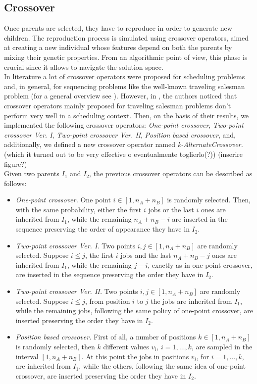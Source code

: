 \documentclass[opre,nonblindrev]{informs3} %
\begin{document}
\subsection{Crossover}
Once parents are selected, they have to reproduce in order to generate new children. The reproduction process is simulated using crossover operators, aimed at creating a new individual whose features depend on both the parents by mixing their genetic properties. From an algorithmic point of view, this phase is crucial since it allows to navigate the solution space. \\
In literature a lot of crossover operators were proposed for scheduling problems and, in general, for sequencing problems like the well-known traveling salesman problem (for a general overview see \cite{cross1}). However, in \cite{sched1}, the authors noticed that crossover operators mainly proposed for traveling salesman problems don't perform very well in a scheduling context. Then, on the basis of their results, we implemented the following crossover operators: \textit{One-point crossover}, \textit{Two-point crossover Ver. I}, \textit{Two-point crossover Ver. II}, \textit{Position based crossover}, and, additionally, we defined a new crossover operator named \textit{k-AlternateCrossover.} (which it turned out to be very effective o eventualmente toglierlo(?)) (inserire figure?)\\
Given two parents $I_1$ and $I_2$, the previous crossover operators can be described as follows: 
\begin{itemize}
	\item \textit{One-point crossover.} One point $i \in [1,n_A+n_B]$ is randomly selected. Then, with the same probability, either the first $i$ jobs or the last $i$ ones are inherited from $I_1$, while the remaining $n_A+n_B-i$ are inserted in the sequence preserving the order of appearance they have in $I_2$. 
	\item \textit{Two-point crossover Ver. I.} Two points $i,j \in [1,n_A+n_B]$ are randomly selected. Suppose $i \le j$, the first $i$ jobs and the last $n_A+n_B-j$ ones are inherited from $I_1$, while the remaining $j-i$, exactly as in one-point crossover, are inserted in the sequence preserving the order they have in $I_2$.
	\item \textit{Two-point crossover Ver. II.} Two points $i,j \in [1,n_A+n_B]$ are randomly selected. Suppose $i \le j$, from position $i$ to $j$ the jobs are inherited from $I_1$, while the remaining jobs, following the same policy of one-point crossover, are inserted preserving the order they have in $I_2$.
	\item \textit{Position based crossover.} First of all, a number of positions $k \in [1,n_A+n_B]$ is randomly selected, then $k$ different values $v_i$, $i=1,\ldots,k$, are sampled in the interval $[1,n_A+n_B].$ At this point the jobs in positions $v_i$, for $i=1,\ldots,k$, are inherited from $I_1$, while the others, following the same idea of one-point crossover, are inserted preserving the order they have in $I_2$.
\end{itemize}
\end{document}
